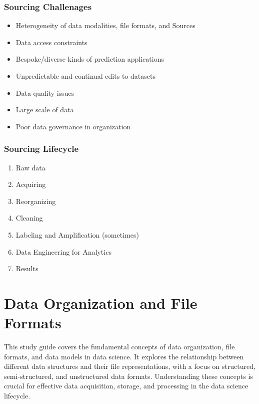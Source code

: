 \documentclass[12pt]{article}
\begin{document}
\subsubsection{Sourcing Challenages}

\begin{itemize}
    \item Heterogeneity of data modalities, file formats, and Sources
    \item Data access constraints
    \item Bespoke/diverse kinds of prediction applications
    \item Unpredictable and continual edits to datasets
    \item Data quality issues
    \item Large scale of data
    \item Poor data governance in organization
\end{itemize}

\subsubsection{Sourcing Lifecycle}

\begin{enumerate}
    \item Raw data
    \item Acquiring
    \item Reorganizing
    \item Cleaning
    \item Labeling and Amplification (sometimes)
    \item Data Engineering for Analytics
    \item Results
\end{enumerate}

\section{Data Organization and File Formats}

\begin{tcolorbox}[colback=blue!5!white,colframe=blue!75!black,title=Overview]
    This study guide covers the fundamental concepts of data organization, file formats, and data models in data science. It explores the relationship between different data structures and their file representations, with a focus on structured, semi-structured, and unstructured data formats. Understanding these concepts is crucial for effective data acquisition, storage, and processing in the data science lifecycle.
\end{tcolorbox}
\end{document}

